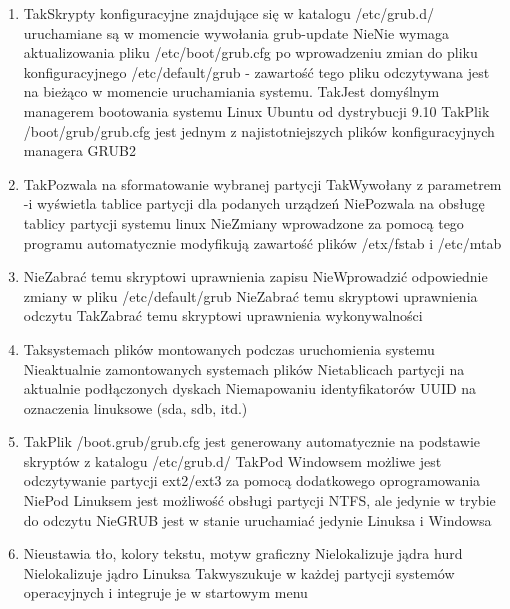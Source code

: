 \begin{enumerate}
	\item {}
	{Tak}{Skrypty konfiguracyjne znajdujące się w katalogu /etc/grub.d/ uruchamiane są w momencie wywołania grub-update}
	{Nie}{Nie wymaga aktualizowania pliku /etc/boot/grub.cfg po wprowadzeniu zmian do pliku konfiguracyjnego /etc/default/grub - zawartość tego pliku odczytywana jest na bieżąco w momencie uruchamiania systemu.}
	{Tak}{Jest domyślnym managerem bootowania systemu Linux Ubuntu od dystrybucji 9.10}
	{Tak}{Plik /boot/grub/grub.cfg jest jednym z najistotniejszych plików konfiguracyjnych managera GRUB2}
	
	\newpage
	
	\item {}
	{Tak}{Pozwala na sformatowanie wybranej partycji}
	{Tak}{Wywołany z parametrem -i wyświetla tablice partycji dla podanych urządzeń}
	{Nie}{Pozwala na obsługę tablicy partycji systemu linux}
	{Nie}{Zmiany wprowadzone za pomocą tego programu automatycznie modyfikują zawartość plików /etx/fstab i /etc/mtab}

	\item {}
	{Nie}{Zabrać temu skryptowi uprawnienia zapisu}
	{Nie}{Wprowadzić odpowiednie zmiany w pliku /etc/default/grub}
	{Nie}{Zabrać temu skryptowi uprawnienia odczytu}
	{Tak}{Zabrać temu skryptowi uprawnienia wykonywalności}
	
	\item {}
	{Tak}{systemach plików montowanych podczas uruchomienia systemu}
	{Nie}{aktualnie zamontowanych systemach plików}
	{Nie}{tablicach partycji na aktualnie podłączonych dyskach}
	{Nie}{mapowaniu identyfikatorów UUID na oznaczenia linuksowe (sda, sdb, itd.)}
	
	\item {}
	{Tak}{Plik /boot.grub/grub.cfg jest generowany automatycznie na podstawie skryptów z katalogu /etc/grub.d/}
	{Tak}{Pod Windowsem możliwe jest odczytywanie partycji ext2/ext3 za pomocą dodatkowego oprogramowania}
	{Nie}{Pod Linuksem jest możliwość obsługi partycji NTFS, ale jedynie w trybie do odczytu}
	{Nie}{GRUB jest w stanie uruchamiać jedynie Linuksa i Windowsa}
	
	\item {}
	{Nie}{ustawia tło, kolory tekstu, motyw graficzny}
	{Nie}{lokalizuje jądra hurd}
	{Nie}{lokalizuje jądro Linuksa}
	{Tak}{wyszukuje w każdej partycji systemów operacyjnych i integruje je w startowym menu}


\end{enumerate}

